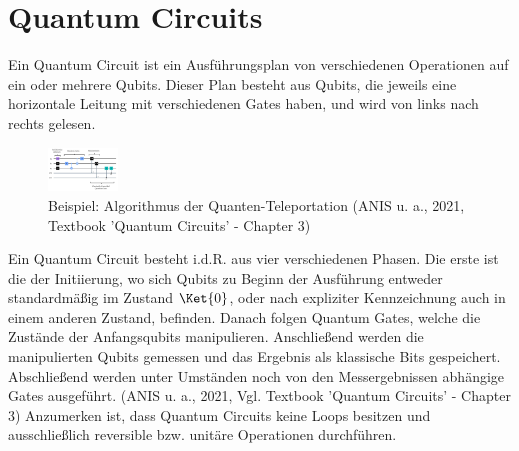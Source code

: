 \section{Quantum Circuits}\newline
Ein Quantum Circuit ist ein Ausführungsplan von verschiedenen Operationen auf ein oder mehrere Qubits. Dieser Plan besteht aus Qubits, die jeweils eine horizontale Leitung mit verschiedenen Gates haben, und wird von links nach rechts gelesen. 

\begin{figure}
     \centering
     \includegraphics[width=70]{content/quantum-teleportation.JPG}

     \caption{Beispiel: Algorithmus der Quanten-Teleportation (ANIS u. a., 2021, Textbook
     ’Quantum Circuits’ - Chapter 3)}
     

\end{figure} 

\newline
Ein Quantum Circuit besteht i.d.R. aus vier verschiedenen Phasen. Die erste ist die der Initiierung, wo sich Qubits zu Beginn der Ausführung entweder standardmäßig im Zustand \(\Ket{0}\), oder nach expliziter Kennzeichnung auch in einem anderen Zustand, befinden. Danach folgen Quantum Gates, welche die Zustände der Anfangsqubits manipulieren. Anschließend werden die manipulierten Qubits gemessen und das Ergebnis als klassische Bits gespeichert. Abschließend werden unter Umständen noch von den Messergebnissen abhängige Gates ausgeführt. (ANIS u. a., 2021, Vgl. Textbook ’Quantum Circuits’ - Chapter 3)
\newline
Anzumerken ist, dass Quantum Circuits keine Loops besitzen und ausschließlich reversible bzw. unitäre Operationen durchführen. 

